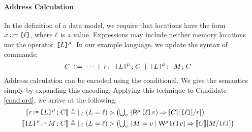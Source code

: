 \paragraph{Address Calculation}

In the definition of a data model, we require
that locations have the form $x\!\!\;\mathrel{\mathord{\vcentcolon}\mkern-1mu\mathord{\vcentcolon}\mathord{{=}}}\;\!\!\texttt{[}\ell\texttt{]}$, where $\ell$
is a value.  Expressions may include neither memory locations nor the
operator $\texttt{[}L\texttt{]}^{\mu}$.
In our example language, we update the syntax of commands:
\begin{gather*}
  C
  \;\mathrel{\mathord{\vcentcolon}\mkern-1mu\mathord{\vcentcolon}\mathord{{=}}}\; \cdots
  \;\mathrel{|}\; r\texttt{:}\mkern-1mu\texttt{=}\,\texttt{[}L\texttt{]}^{\mu}\texttt{;}\,\allowbreak C 
  \;\mathrel{|}\; \texttt{[}L\texttt{]}^{\mu}\texttt{:}\mkern-1mu\texttt{=}\,M\texttt{;}\,\allowbreak C
\end{gather*}
Address calculation can be encoded using the conditional.  We give the
semantics simply by expanding this encoding.  Applying this technique to Candidate
\ref{cand:ord}, we arrive at the following:
  \begin{align*}
  \sem{\aReg\GETS\REF{\cExp}^\amode\SEMI \aCmd} & \eqdef
    \;\textstyle\parallel_\cVal (\cExp=\cVal) \guard \bigl(
    \textstyle\bigcup_\aVal\;
    (\DRmode{\REF{\cVal}}\aVal) \prefix \sem{\aCmd} [\REF{\cVal}]/\aReg]
    \bigr)
    \\
  \sem{\REF{\cExp}^\amode\GETS\aExp\SEMI \aCmd} & \eqdef
    \;\textstyle\parallel_\cVal (\cExp=\cVal) \guard 
    \bigl(\textstyle\bigcup_\aVal\; (\aExp=\aVal \mid \DWmode{\REF{\cVal}}\aVal) \prefix \sem{\aCmd}[\aExp/\REF{\cVal}]\bigr)
  \end{align*}
